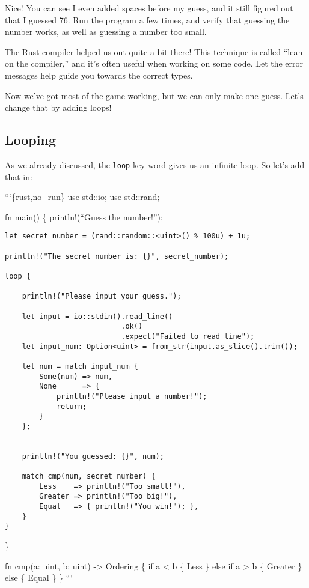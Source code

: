 \documentclass[]{article}
\begin{document}
Nice! You can see I even added spaces before my guess, and it still
figured out that I guessed 76. Run the program a few times, and verify
that guessing the number works, as well as guessing a number too small.

The Rust compiler helped us out quite a bit there! This technique is
called ``lean on the compiler,'' and it's often useful when working on
some code. Let the error messages help guide you towards the correct
types.

Now we've got most of the game working, but we can only make one guess.
Let's change that by adding loops!

\subsection{Looping}\label{looping-1}

As we already discussed, the \texttt{loop} key word gives us an infinite
loop. So let's add that in:

```\{rust,no\_run\} use std::io; use std::rand;

fn main() \{ println!(``Guess the number!'');

\begin{verbatim}
let secret_number = (rand::random::<uint>() % 100u) + 1u;

println!("The secret number is: {}", secret_number);

loop {

    println!("Please input your guess.");

    let input = io::stdin().read_line()
                           .ok()
                           .expect("Failed to read line");
    let input_num: Option<uint> = from_str(input.as_slice().trim());

    let num = match input_num {
        Some(num) => num,
        None      => {
            println!("Please input a number!");
            return;
        }
    };


    println!("You guessed: {}", num);

    match cmp(num, secret_number) {
        Less    => println!("Too small!"),
        Greater => println!("Too big!"),
        Equal   => { println!("You win!"); },
    }
}
\end{verbatim}

\}

fn cmp(a: uint, b: uint) -\textgreater{} Ordering \{ if a \textless{} b
\{ Less \} else if a \textgreater{} b \{ Greater \} else \{ Equal \} \}
```
\end{document}
